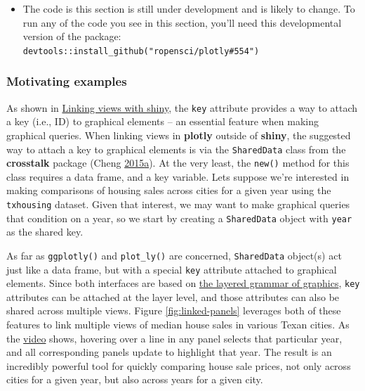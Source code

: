 \documentclass[12pt,]{isuthesis}
\newenvironment{Shaded}{\begin{snugshade}}{\end{snugshade}}
\newcommand{\KeywordTok}[1]{\textcolor[rgb]{0.13,0.29,0.53}{\textbf{{#1}}}}
\newcommand{\StringTok}[1]{\textcolor[rgb]{0.31,0.60,0.02}{{#1}}}
\newcommand{\CommentTok}[1]{\textcolor[rgb]{0.56,0.35,0.01}{\textit{{#1}}}}
\newcommand{\NormalTok}[1]{{#1}}
\newenvironment{rmdblock}[1]
  {\begin{shaded*}
  \begin{itemize}
  \renewcommand{\labelitemi}{
    \raisebox{-.7\height}[0pt][0pt]{
      {\setkeys{Gin}{width=3em,keepaspectratio}\texttt{[image: images/\#1]}}
    }
  }
  \item
  }
  {
  \end{itemize}
  \end{shaded*}
  }
\newenvironment{rmdwarning}
  {\begin{rmdblock}{warning}}
  {\end{rmdblock}}
\begin{document}
\begin{rmdwarning}
The code is this section is still under development and is likely to
change. To run any of the code you see in this section, you'll need this
developmental version of the package:
\texttt{devtools::install\_github("ropensci/plotly\#554")}
\end{rmdwarning}

\subsubsection{Motivating examples}\label{motivating-examples}

As shown in \protect\hyperlink{linking-views-with-shiny}{Linking views
with shiny}, the \texttt{key} attribute provides a way to attach a key
(i.e., ID) to graphical elements -- an essential feature when making
graphical queries. When linking views in \textbf{plotly} outside of
\textbf{shiny}, the suggested way to attach a key to graphical elements
is via the \texttt{SharedData} class from the \textbf{crosstalk} package
(Cheng
\protect\hyperlink{ref-crosstalk}{2015}\protect\hyperlink{ref-crosstalk}{a}).
At the very least, the \texttt{new()} method for this class requires a
data frame, and a key variable. Lets suppose we're interested in making
comparisons of housing sales across cities for a given year using the
\texttt{txhousing} dataset. Given that interest, we may want to make
graphical queries that condition on a year, so we start by creating a
\texttt{SharedData} object with \texttt{year} as the shared key.

\begin{Shaded}
\end{Shaded}

As far as \texttt{ggplotly()} and \texttt{plot\_ly()} are concerned,
\texttt{SharedData} object(s) act just like a data frame, but with a
special \texttt{key} attribute attached to graphical elements. Since
both interfaces are based on
\protect\hyperlink{the-layered-grammar-of-graphics}{the layered grammar
of graphics}, \texttt{key} attributes can be attached at the layer
level, and those attributes can also be shared across multiple views.
Figure \ref{fig:linked-panels} leverages both of these features to link
multiple views of median house sales in various Texan cities. As the
\href{http://i.imgur.com/DdPdSBB.gif}{video} shows, hovering over a line
in any panel selects that particular year, and all corresponding panels
update to highlight that year. The result is an incredibly powerful tool
for quickly comparing house sale prices, not only across cities for a
given year, but also across years for a given city.
\end{document}
